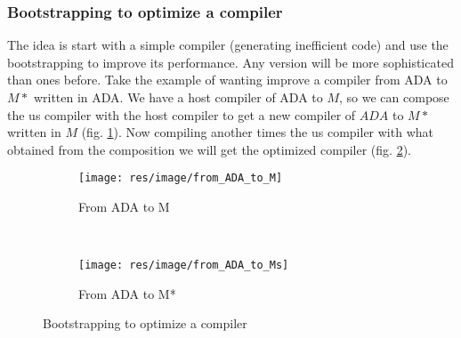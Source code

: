 \subsubsection{Bootstrapping to optimize a compiler}
The idea is start with a simple compiler (generating inefficient code) and use
the bootstrapping to improve its performance. Any version will be more
sophisticated than ones before. Take the example of wanting improve a compiler
from ADA to $M*$ written in ADA. We have a host compiler of ADA to $M$, so we
can compose the us compiler with the host compiler to get a new compiler of
$ADA$ to $M*$ written in $M$ (fig. \ref{fig:from_ADA_to_M}).
Now compiling another times the us compiler with what obtained from the
composition we will get the optimized compiler (fig. \ref{fig:from_ADA_to_Ms}).

\begin{figure}[H]
  \centering
  \begin{subfigure}[b]{\textwidth}
    \texttt{[image: res/image/from\_ADA\_to\_M]}
    \caption{From ADA to M}
    \label{fig:from_ADA_to_M}
  \end{subfigure}
  ~
  \begin{subfigure}[b]{\textwidth}
    \texttt{[image: res/image/from\_ADA\_to\_Ms]}
    \caption{From ADA to M*}
    \label{fig:from_ADA_to_Ms}
  \end{subfigure}
  \caption{Bootstrapping to optimize a compiler}
  \label{fig:bootstrapping_optimize}
\end{figure}
